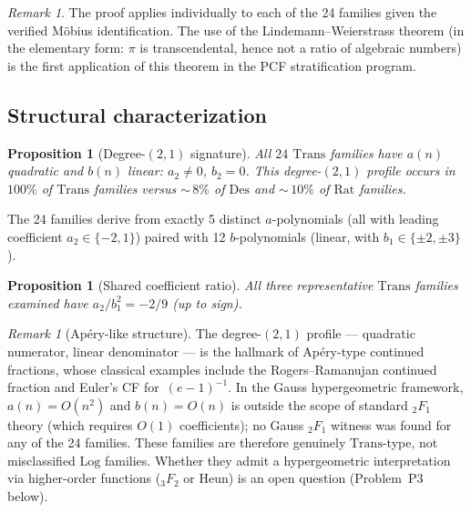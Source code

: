 \documentclass[12pt, reqno]{amsart}
\newtheorem{proposition}[theorem]{Proposition}
\theoremstyle{definition}
\theoremstyle{remark}
\newtheorem{remark}[theorem]{Remark}
\newcommand{\Rat}{\mathrm{Rat}}
\newcommand{\Log}{\mathrm{Log}}
\newcommand{\Trans}{\mathrm{Trans}}
\newcommand{\Des}{\mathrm{Des}}
\begin{document}
\begin{remark}\label{rem:LW}
The proof applies individually to each of the 24 families
given the verified M\"obius identification. The use of the Lindemann--Weierstrass
theorem (in the elementary form: $\pi$ is transcendental, hence not a ratio of
algebraic numbers) is the first application of this theorem in the PCF
stratification program.
\end{remark}

\subsection{Structural characterization}\label{ssec:structural}

\begin{proposition}[Degree-$(2,1)$ signature]\label{prop:deg21}
All $24$ $\Trans$ families have
$a(n)$ quadratic and $b(n)$ linear: $a_2 \ne 0$, $b_2 = 0$.
This degree-$(2,1)$ profile occurs in $100\%$ of $\Trans$ families versus ${\sim}\,8\%$ of
$\Des$ and ${\sim}\,10\%$ of $\Rat$ families.
\end{proposition}

The 24 families derive from exactly 5 distinct $a$-polynomials (all with
leading coefficient $a_2 \in \{-2, 1\}$) paired with 12 $b$-polynomials (linear,
with $b_1 \in \{\pm 2, \pm 3\}$).

\begin{proposition}[Shared coefficient ratio]\label{prop:ratio}
All three representative
$\Trans$ families examined have $a_2/b_1^2 = -2/9$ (up to sign).
\end{proposition}

\begin{remark}[Ap\'ery-like structure]\label{rem:apery}
The degree-$(2,1)$ profile --- quadratic
numerator, linear denominator --- is the hallmark of Ap\'ery-type continued
fractions, whose classical examples include the Rogers--Ramanujan continued
fraction and Euler's CF for~$(e-1)^{-1}$. In the Gauss hypergeometric framework,
$a(n) = O(n^2)$ and $b(n) = O(n)$ is outside the scope of standard ${}_2F_1$ theory
(which requires $O(1)$ coefficients); no Gauss ${}_2F_1$ witness was found for any
of the 24 families. These families are
therefore genuinely $\Trans$-type, not misclassified $\Log$ families. Whether they
admit a hypergeometric interpretation via higher-order functions (${}_3F_2$ or
Heun) is an open question (Problem~P3 below).
\end{remark}


\end{document}
